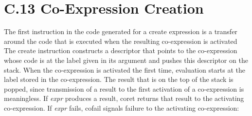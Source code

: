 \begin{center}
\tabletail{}
\tablelasttail{}
\begin{supertabular}{|m{1.9073598in}|m{2.75596in}|}

\end{supertabular}
\end{center}


\section{C.13 Co-Expression Creation}

The first instruction in the code generated for a create expression is
a transfer around the code that is executed when the resulting
co-expression is activated The create instruction constructs a
descriptor that points to the co-expression whose code is at the label
given in its argument and pushes this descriptor on the stack. When
the co-expression is activated the first time, evaluation starts at
the label stored in the co-expression. The result that is on the top
of the stack is popped, since transmission of a result to the first
activation of a co-expression is meaningless. If \textit{expr}
produces a result, coret returns that result to the activating
co-expression. If \textit{expr} fails, cofail signals failure to the
activating co-expression:

